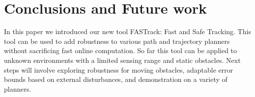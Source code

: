 \section{Conclusions and Future work}
In this paper we introduced our new tool FASTrack: Fast and Safe Tracking. This tool can be used to add robustness to various path and trajectory planners without sacrificing fast online computation. So far this tool can be applied to unknown environments with a limited sensing range and static obstacles. Next steps will involve exploring robustness for moving obstacles, adaptable error bounds based on external disturbances, and demonstration on a variety of planners. 